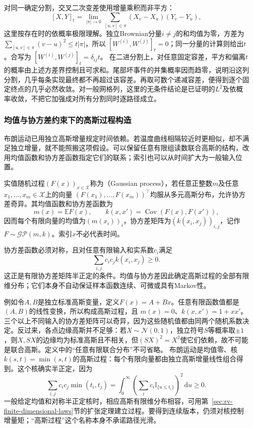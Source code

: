 对同一确定分割，交叉二次变差使用增量乘积而非平方：
\[
[X,Y]_t=\lim_{|\pi|\to0}\sum_{[u,v]\in\pi}
(X_v-X_u)(Y_v-Y_u),
\]
这里按存在时的依概率极限理解。独立Brownian分量\(i\ne j\)的和均值为零，方差为
\(\sum_{[u,v]\in\pi}(v-u)^2\leq t|\pi|\)，所以
\([W^{(i)},W^{(j)}]_t=0\)；同一分量的计算则给出\(t\)。合写为
\([W^{(i)},W^{(j)}]_t=\delta_{ij}t\)。
在二进分割上，对任意固定容差，平方和偏离\(t\)的概率由上述方差界控制且可求和。尾部坏事件的并集概率因而趋零，说明沿这列分割，几乎每条实现最终都不再超过该容差。再取可数个递减容差，便得到逐个固定终点的几乎必然收敛。对一般网格列，这里的无条件结论是已证明的\(L^2\)及依概率收敛，不把它加强成对所有分割同时逐路径成立。

\subsubsection{均值与协方差约束下的高斯过程构造}
布朗运动已用独立高斯增量规定时间依赖。若温度曲线相隔较近时更相似，却不满足独立增量，就不能照搬这项假设。可以保留任意有限组读数联合高斯的结构，改用均值函数和协方差函数指定它们的联系；索引也可以从时间扩大为一般输入位置。
\begin{definition}[高斯过程]
  \label{def:stoch-gaussian-process}
  实值随机过程\((F(x))_{x\in\mathcal X}\)称为（Gaussian process），若任意正整数\(m\)及任意\(x_1,\ldots,x_m\in\mathcal X\)上的向量
  \((F(x_1),\ldots,F(x_m))^\top\)均服从多元高斯分布，允许协方差奇异。其均值函数和协方差函数为
  \[
    m(x)=\mathbb E F(x),\qquad
    k(x,x')=\operatorname{Cov}(F(x),F(x')),
  \]
  因而每个有限向量的均值为\((m(x_i))_i\)，协方差矩阵为\((k(x_i,x_j))_{i,j}\)，记作\(F\sim\mathcal{GP}(m,k)\)。索引\(x\)不必代表时间。
\end{definition}
协方差函数必须对称，且对任意有限输入和实系数\(c_i\)满足
\[
  \sum_{i,j}c_ic_jk(x_i,x_j)\geq0.
\]
这正是有限协方差矩阵半正定的条件。均值与协方差因此确定高斯过程的全部有限维分布；它们本身不自动保证样本函数连续、可微或具有Markov性。

例如令\(A,B\)是独立标准高斯变量，定义\(F(x)=A+Bx\)。任意有限函数值都是\((A,B)\)的线性变换，所以构成高斯过程，且
\(m(x)=0\)、\(k(x,x')=1+xx'\)。三个以上不同输入的协方差矩阵可以奇异，因为这些随机值都由同两个随机系数决定。反过来，各点边缘高斯并不足够：若\(X\sim\mathcal N(0,1)\)，独立符号\(S\)等概率取\(\pm1\)，则\(X,SX\)的边缘均为标准高斯且不相关，但\((SX)^2=X^2\)使它们依赖，故不可能是联合高斯。定义中的“任意有限联合分布”不可省略。
布朗运动是均值零、核\(k(s,t)=\min(s,t)\)的高斯过程：每个有限向量都由独立高斯增量线性组合得到。这个核确实半正定，因为
\[
\sum_{i,j}c_ic_j\min(t_i,t_j)
=\int_0^\infty\left(\sum_i c_i\mathbb I_{\{u\leq t_i\}}\right)^2\,\mathrm du\geq0.
\]
一般给定均值和对称半正定核时，相应高斯有限维分布相容，可用第~\ref{sec:rv-finite-dimensional-laws}节的扩张定理建立过程。要得到连续版本，仍须对核控制增量矩；“高斯过程”这个名称本身不承诺路径光滑。



